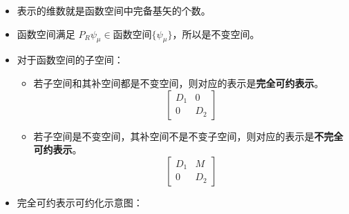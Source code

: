\begin{note}
    \begin{itemize}
        \item 表示的维数就是函数空间中完备基矢的个数。
        \item 函数空间满足 $P_R \psi_\mu \in \text{函数空间} \{\psi_\mu\}$，所以是不变空间。
        \item 对于函数空间的子空间：
            \begin{itemize}
                \item 若子空间和其补空间都是不变空间，则对应的表示是\textbf{完全可约表示}。
                \begin{equation}
                    \begin{bmatrix} D_1 & 0 \\ 0 & D_2 \end{bmatrix}
                \end{equation}
                \item 若子空间是不变空间，其补空间不是不变子空间，则对应的表示是\textbf{不完全可约表示}。
                \begin{equation}
                    \begin{bmatrix} D_1 & M \\ 0 & D_2 \end{bmatrix}
                \end{equation}
            \end{itemize}
        \item 完全可约表示可约化示意图：
    \end{itemize}
\end{note}




